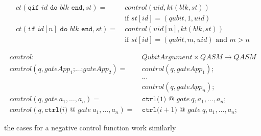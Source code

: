 \begin{align*}
        ct(\texttt{qif } id \texttt{ do } blk \texttt{ end}, st) = \ 
            &  control(uid, kt(blk, st)) \\
            & \text{if } st[id] = (qubit, 1, uid)\\
        ct(\texttt{if } id[n] \texttt{ do } blk \texttt{ end}, st) = \ 
            &  control(uid[n], kt(blk, st)) \\
            & \text{if } st[id] = (qubit, m, uid) \text{ and } m > n
\end{align*}


\begin{align*}
    control : \ & QubitArgument \times QASM \to QASM\\
    control(q, gateApp_1\texttt{;} ...\texttt{;} gateApp_2) = \ & control(q, gateApp_1)\texttt{;}\\
        & ...\\
        & control(q, gateApp_n)\texttt{;}\\
    control(q, gate \ a_1, \dots, a_n ) = \ & \texttt{ctrl(1) @ } gate \ q, a_1, \dots, a_n\texttt{;}\\
    control(q, \texttt{ctrl(}i \texttt{) @ } gate \ a_1, \dots, a_n ) = \ & \texttt{ctrl(}i+1 \texttt{) @ } gate \ q, a_1, \dots, a_n\texttt{;}
\end{align*}

the cases for a negative control function work similarly